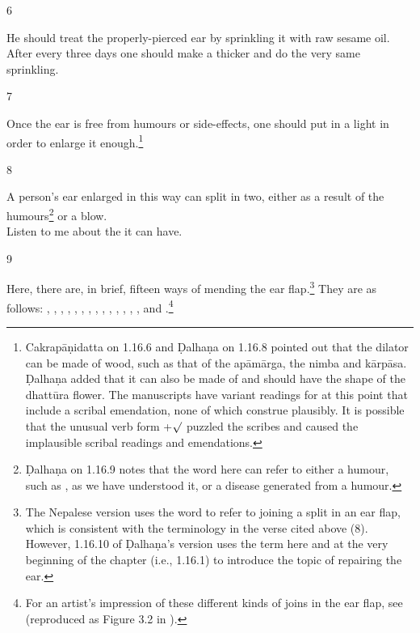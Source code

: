 \begin{translation}
\item[6] 
    
He should treat the properly-pierced ear by sprinkling it with raw sesame
oil.   After every three days one should make a thicker  and
do the very same sprinkling.
    
\item[7] 
    
Once the ear is free from humours or side-effects, one should put in a light
 in order to enlarge it
enough.\footnote{Cakrapāṇidatta on 1.16.6 \citep[127]{acar-1939} and Ḍalhaṇa
    on 1.16.8 \citep[77]{vulgate} pointed out that the dilator can be made of
    wood, such as that of the \gls{apāmārga}, the  \gls{nimba} and  \gls{kārpāsa}.
    Ḍalhaṇa added that it can also be made of  and should
    have the shape of the \gls{dhattūra} flower. The manuscripts have variant
    readings for  at this point that include a
    scribal emendation, none of which construe plausibly. It is possible that the
    unusual verb form +$\surd$ puzzled the scribes and caused the
    implausible scribal readings and emendations.}
    
\item[8]
    
\begin{em}
A person's ear enlarged in this way can split in two, either as a result of the 
humours\footnote{Ḍalhaṇa on 1.16.9  \citep[77]{vulgate} notes that the word  
here can refer to either a humour, such as , as we have 
understood it, or a 
disease generated from a humour.} or a blow.\\ Listen to me about the 
it can have. 
    \end{em}
    
\item[9]
    
Here, there are, in brief, fifteen ways of mending the ear flap.\footnote{The Nepalese version 
uses the word  to refer to joining a split in an ear flap, which is consistent 
with the terminology in the verse cited above (8). However, 1.16.10 of Ḍalhaṇa's version 
\citep[77]{vulgate} uses the term  here and at the very beginning of the 
chapter (i.e., 1.16.1) to introduce the topic of repairing the ear.}  They are as follows:
    , , 
    , , , 
    , , , 
    , , 
    , ,
    , , and .\footnote{For an artist's impression of these different kinds of joins in the ear flap, see \cite[290]{majn-1975} (reproduced as Figure 3.2 in \cite[154]{wuja-2003}).}
    

\end{translation}
